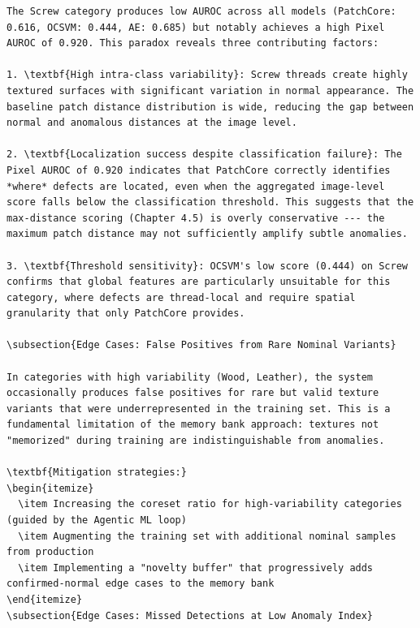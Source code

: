 \documentclass[12pt,a4paper,oneside]{report}
\begin{document}
\begin{verbatim}
The Screw category produces low AUROC across all models (PatchCore: 0.616, OCSVM: 0.444, AE: 0.685) but notably achieves a high Pixel AUROC of 0.920. This paradox reveals three contributing factors:

1. \textbf{High intra-class variability}: Screw threads create highly textured surfaces with significant variation in normal appearance. The baseline patch distance distribution is wide, reducing the gap between normal and anomalous distances at the image level.

2. \textbf{Localization success despite classification failure}: The Pixel AUROC of 0.920 indicates that PatchCore correctly identifies *where* defects are located, even when the aggregated image-level score falls below the classification threshold. This suggests that the max-distance scoring (Chapter 4.5) is overly conservative --- the maximum patch distance may not sufficiently amplify subtle anomalies.

3. \textbf{Threshold sensitivity}: OCSVM's low score (0.444) on Screw confirms that global features are particularly unsuitable for this category, where defects are thread-local and require spatial granularity that only PatchCore provides.

\subsection{Edge Cases: False Positives from Rare Nominal Variants}

In categories with high variability (Wood, Leather), the system occasionally produces false positives for rare but valid texture variants that were underrepresented in the training set. This is a fundamental limitation of the memory bank approach: textures not "memorized" during training are indistinguishable from anomalies.

\textbf{Mitigation strategies:}
\begin{itemize}
  \item Increasing the coreset ratio for high-variability categories (guided by the Agentic ML loop)
  \item Augmenting the training set with additional nominal samples from production
  \item Implementing a "novelty buffer" that progressively adds confirmed-normal edge cases to the memory bank
\end{itemize}
\subsection{Edge Cases: Missed Detections at Low Anomaly Index}


\end{verbatim}
\end{document}
